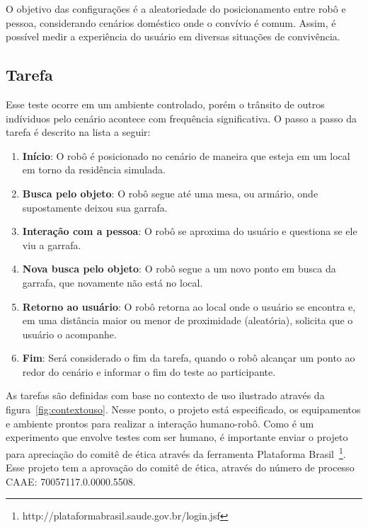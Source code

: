 O objetivo das configurações é a aleatoriedade do posicionamento entre robô e pessoa, considerando cenários doméstico onde o convívio é comum. Assim, é possível medir a experiência do usuário em diversas situações de convivência.

\subsection{Tarefa}

Esse teste ocorre em um ambiente controlado, porém o trânsito de outros indíviduos pelo cenário acontece com frequência significativa. O passo a passo da tarefa é descrito na lista a seguir:

\begin{enumerate}
	\item \textbf{Início}: O robô é posicionado no cenário de maneira que esteja em um local em torno da residência simulada.
	\item \textbf{Busca pelo objeto}: O robô segue até uma mesa, ou armário, onde supostamente deixou sua garrafa.
	\item \textbf{Interação com a pessoa}: O robô se aproxima do usuário e questiona se ele viu a garrafa.
	\item \textbf{Nova busca pelo objeto}: O robô segue a um novo ponto em busca da garrafa, que novamente não está no local.
	\item \textbf{Retorno ao usuário}: O robô retorna ao local onde o usuário se encontra e, em uma distância maior ou menor de proximidade (aleatória), solicita que o usuário o acompanhe.
	\item \textbf{Fim}: Será considerado o fim da tarefa, quando o robô alcançar um ponto ao redor do cenário e informar o fim do teste ao participante.
\end{enumerate}

As tarefas são definidas com base no contexto de uso ilustrado através da figura~\ref{fig:contextouso}. Nesse ponto, o projeto está especificado, os equipamentos e ambiente prontos para realizar a interação humano-robô. Como é um experimento que envolve testes com ser humano, é importante enviar o projeto para apreciação do comitê de ética através da ferramenta Plataforma Brasil~\footnote{http://plataformabrasil.saude.gov.br/login.jsf}. Esse projeto tem a aprovação do comitê de ética, através do número de processo CAAE: 70057117.0.0000.5508.


